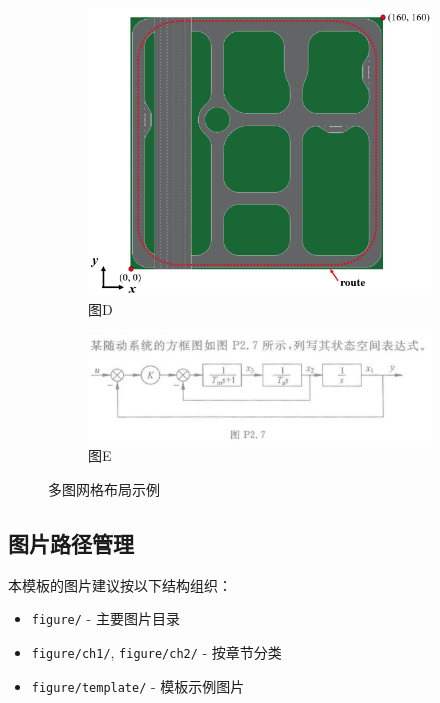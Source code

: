 \documentclass[../main]{subfiles}
\begin{document}
\begin{figure}[H]
    \begin{subfigure}{0.45\textwidth}
        \centering
        \includegraphics[width=\linewidth]{figure/template/2025-05-27 082408.png}
        \caption{图D}
        \label{fig:grid-d}
    \end{subfigure}
    \hfill
    \begin{subfigure}{0.45\textwidth}
        \centering
        \includegraphics[width=\linewidth]{figure/template/20250402171850.png}
        \caption{图E}
        \label{fig:grid-e}
    \end{subfigure}
    
    \caption{多图网格布局示例}
    \label{fig:grid-layout}
\end{figure}

\subsection{图片路径管理}
本模板的图片建议按以下结构组织：
\begin{itemize}
    \item \texttt{figure/} - 主要图片目录
    \item \texttt{figure/ch1/}, \texttt{figure/ch2/} - 按章节分类
    \item \texttt{figure/template/} - 模板示例图片
\end{itemize}
\end{document}

